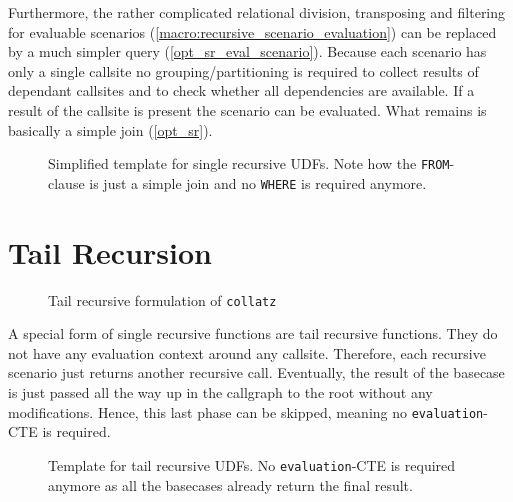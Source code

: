 Furthermore, the rather complicated relational division, transposing and filtering for evaluable scenarios (\autoref{macro:recursive_scenario_evaluation}) can be replaced by a much simpler query (\autoref{opt_sr_eval_scenario}). Because each scenario has only a single callsite no grouping/partitioning is required to collect results of dependant callsites and to check whether all dependencies are available. If a result of the callsite is present the scenario can be evaluated. What remains is basically a simple join (\autoref{opt_sr}).

\begin{figure}[h!]
    \centering
    \caption{Simplified template for single recursive UDFs. Note how the \texttt{FROM}-clause is just a simple join and no \texttt{WHERE} is required anymore.}
    \label{opt_sr_eval_scenario}
\end{figure}



\section{Tail Recursion}

\begin{wrapfigure}{r}{0.6\textwidth}
  \vspace{-10pt}
  \caption{Tail recursive formulation of \texttt{collatz}}
  \label{lst:fib_tr}
\end{wrapfigure}

A special form of single recursive functions are tail recursive functions. They do not have any evaluation context around any callsite. Therefore, each recursive scenario just returns another recursive call. Eventually, the result of the basecase is just passed all the way up in the callgraph to the root without any modifications. Hence, this last phase can be skipped, meaning no \texttt{evaluation}-CTE is required.

\begin{figure}[h!]
    \centering
    \caption{Template for tail recursive UDFs. No \texttt{evaluation}-CTE is required anymore as all the basecases already return the final result.}
    \label{tr_opt_template}
\end{figure}


